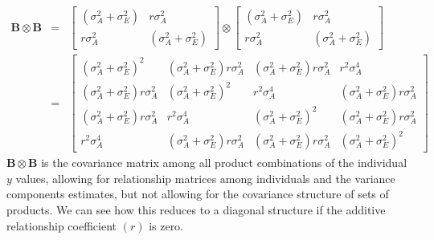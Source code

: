\documentclass[titlepage,a4paper,12pt]{article}  %
\begin{document}
\begin{eqnarray}
\bm{B} \otimes \bm{B} & = & \begin{bmatrix} (\sigma^{2}_{A} + \sigma^{2}_{E}) & r \sigma^{2}_{A} \\ r \sigma^{2}_{A} & (\sigma^{2}_{A} + \sigma^{2}_{E}) \end{bmatrix}
\otimes
\begin{bmatrix} (\sigma^{2}_{A} + \sigma^{2}_{E}) & r \sigma^{2}_{A} \\ r \sigma^{2}_{A} & (\sigma^{2}_{A} + \sigma^{2}_{E}) \end{bmatrix} \\
    & = & \begin{bmatrix} (\sigma^{2}_{A} + \sigma^{2}_{E})^{2} & (\sigma^{2}_{A} + \sigma^{2}_{E})r \sigma^{2}_{A} & (\sigma^{2}_{A} + \sigma^{2}_{E})r \sigma^{2}_{A} & r^{2} \sigma^{4}_{A}\\ 
 (\sigma^{2}_{A} + \sigma^{2}_{E})r \sigma^{2}_{A} & (\sigma^{2}_{A} + \sigma^{2}_{E})^{2} & r^{2} \sigma^{4}_{A} & (\sigma^{2}_{A} + \sigma^{2}_{E})r \sigma^{2}_{A} \\
(\sigma^{2}_{A} + \sigma^{2}_{E})r \sigma^{2}_{A} & r^{2} \sigma^{4}_{A} & (\sigma^{2}_{A} + \sigma^{2}_{E})^{2} & (\sigma^{2}_{A} + \sigma^{2}_{E})r \sigma^{2}_{A} \\
r^{2} \sigma^{4}_{A} & (\sigma^{2}_{A} + \sigma^{2}_{E})r \sigma^{2}_{A} & (\sigma^{2}_{A} + \sigma^{2}_{E})r \sigma^{2}_{A} & (\sigma^{2}_{A} + \sigma^{2}_{E})^{2} \end{bmatrix}
\end{eqnarray}
 $\bm{B} \otimes \bm{B}$ is the covariance matrix among all product combinations of the individual $y$ values, allowing for relationship matrices among individuals and the variance components estimates, but not allowing for the covariance structure of sets of products. We can see how this reduces to a diagonal structure if the additive relationship coefficient $(r)$ is zero. 
\end{document}
